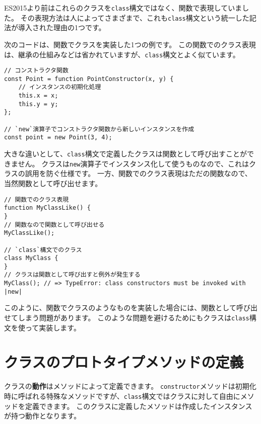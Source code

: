 \begin{tcolorbox}[title=\texttt{class}構文と関数でのクラスの違い]\label{class-vs-function}

ES2015より前はこれらのクラスを\texttt{class}構文ではなく、関数で表現していました。
その表現方法は人によってさまざまで、これも\texttt{class}構文という統一した記法が導入された理由の1つです。

次のコードは、関数でクラスを実装した1つの例です。
この関数でのクラス表現は、継承の仕組みなどは省かれていますが、\texttt{class}構文とよく似ています。

\begin{lstlisting}
// コンストラクタ関数
const Point = function PointConstructor(x, y) {
    // インスタンスの初期化処理
    this.x = x;
    this.y = y;
};

// `new`演算子でコンストラクタ関数から新しいインスタンスを作成
const point = new Point(3, 4);
\end{lstlisting}

大きな違いとして、\texttt{class}構文で定義したクラスは関数として呼び出すことができません。
クラスは\texttt{new}演算子でインスタンス化して使うものなので、これはクラスの誤用を防ぐ仕様です。
一方、関数でのクラス表現はただの関数なので、当然関数として呼び出せます。

\begin{lstlisting}
// 関数でのクラス表現
function MyClassLike() {
}
// 関数なので関数として呼び出せる
MyClassLike(); 

// `class`構文でのクラス
class MyClass {
}
// クラスは関数として呼び出すと例外が発生する
MyClass(); // => TypeError: class constructors must be invoked with |new|
\end{lstlisting}

このように、関数でクラスのようなものを実装した場合には、関数として呼び出せてしまう問題があります。
このような問題を避けるためにもクラスは\texttt{class}構文を使って実装します。
\end{tcolorbox}

\hypertarget{class-prototype-method-definition}{%
\section{クラスのプロトタイプメソッドの定義}\label{class-prototype-method-definition}}

クラスの\textbf{動作}はメソッドによって定義できます。
\texttt{constructor}メソッドは初期化時に呼ばれる特殊なメソッドですが、\texttt{class}構文ではクラスに対して自由にメソッドを定義できます。
このクラスに定義したメソッドは作成したインスタンスが持つ動作となります。

